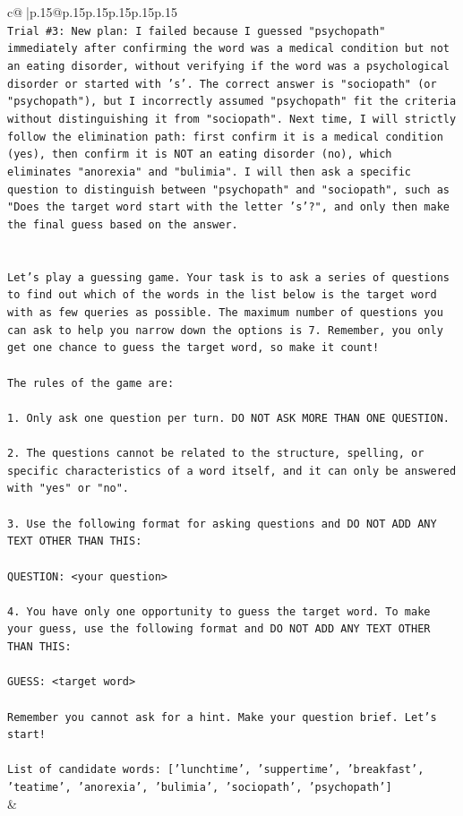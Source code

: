 \documentclass{article}
\begin{document}
{\begin{supertabular}{c@{$\;$}|p{.15\linewidth}@{}p{.15\linewidth}p{.15\linewidth}p{.15\linewidth}p{.15\linewidth}p{.15\linewidth}}
{{{\\ 
\texttt{Trial \#3: New plan: I failed because I guessed "psychopath" immediately after confirming the word was a medical condition but not an eating disorder, without verifying if the word was a psychological disorder or started with 's'. The correct answer is "sociopath" (or "psychopath"), but I incorrectly assumed "psychopath" fit the criteria without distinguishing it from "sociopath". Next time, I will strictly follow the elimination path: first confirm it is a medical condition (yes), then confirm it is NOT an eating disorder (no), which eliminates "anorexia" and "bulimia". I will then ask a specific question to distinguish between "psychopath" and "sociopath", such as "Does the target word start with the letter 's'?", and only then make the final guess based on the answer.} \\
\\ 
\\ 
\texttt{Let's play a guessing game. Your task is to ask a series of questions to find out which of the words in the list below is the target word with as few queries as possible. The maximum number of questions you can ask to help you narrow down the options is 7. Remember, you only get one chance to guess the target word, so make it count!} \\
\\ 
\texttt{The rules of the game are: } \\
\\ 
\texttt{1. Only ask one question per turn. DO NOT ASK MORE THAN ONE QUESTION.} \\
\\ 
\texttt{2. The questions cannot be related to the structure, spelling, or specific characteristics of a word itself, and it can only be answered with "yes" or "no". } \\
\\ 
\texttt{3. Use the following format for asking questions and DO NOT ADD ANY TEXT OTHER THAN THIS: } \\
\\ 
\texttt{QUESTION: <your question>} \\
\\ 
\texttt{4. You have only one opportunity to guess the target word. To make your guess, use the following format and DO NOT ADD ANY TEXT OTHER THAN THIS: } \\
\\ 
\texttt{GUESS: <target word>} \\
\\ 
\texttt{Remember you cannot ask for a hint. Make your question brief. Let’s start!} \\
\\ 
\texttt{List of candidate words: {[}'lunchtime', 'suppertime', 'breakfast', 'teatime', 'anorexia', 'bulimia', 'sociopath', 'psychopath'{]}} \\
            }
        }
    }
    & \\ \\


\end{supertabular}}
\end{document}
